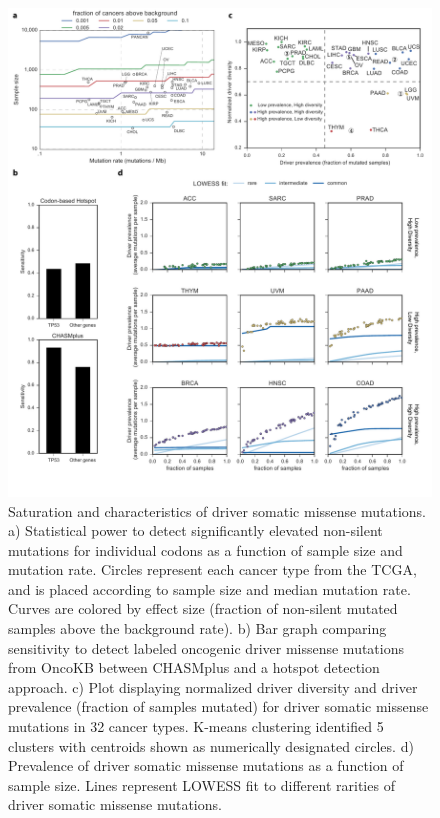 \begin{figure}
  \centering
  \makeatletter
  \let\@currsize\normalsize
  \includegraphics[width=0.9\linewidth]{figures/chapter6/diversity_and_saturation.pdf}
  \caption[Saturation and characteristics of driver somatic missense mutations.]{Saturation and characteristics of driver somatic missense mutations. a) Statistical power to detect significantly elevated non-silent mutations for individual codons as a function of sample size and mutation rate. Circles represent each cancer type from the TCGA, and is placed according to sample size and median mutation rate. Curves are colored by effect size (fraction of non-silent mutated samples above the background rate). b) Bar graph comparing sensitivity to detect labeled oncogenic driver missense mutations from OncoKB between CHASMplus and a hotspot detection approach. c) Plot displaying normalized driver diversity and driver prevalence (fraction of samples mutated) for driver somatic missense mutations in 32 cancer types. K-means clustering identified 5 clusters with centroids shown as numerically designated circles. d) Prevalence of driver somatic missense mutations as a function of sample size. Lines represent LOWESS fit to different rarities of driver somatic missense mutations.}
  \label{fig:chasmplus_power}
\end{figure}

